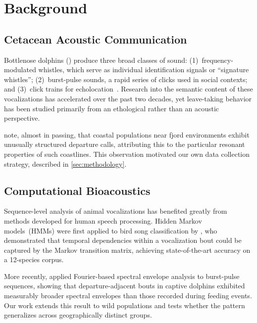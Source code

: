 
\section{Background}
\label{sec:background}

\subsection{Cetacean Acoustic Communication}
\label{subsec:cetacean-acoustics}

Bottlenose dolphins () produce three broad classes of sound:
(1)~frequency-modulated whistles, which serve as individual identification signals or ``signature whistles'';
(2)~burst-pulse sounds, a rapid series of clicks used in social contexts;
and (3)~click trains for echolocation~\citep{Wonko2021communication}.
Research into the semantic content of these vocalizations has accelerated over the past two decades,
yet leave-taking behavior has been studied primarily from an ethological rather than an acoustic perspective.

\citet{Slartibartfast2023topology} note, almost in passing, that coastal populations near fjord environments
exhibit unusually structured departure calls, attributing this to the particular resonant properties of such coastlines.
This observation motivated our own data collection strategy, described in \cref{sec:methodology}.

\subsection{Computational Bioacoustics}
\label{subsec:comp-bioacoustics}

Sequence-level analysis of animal vocalizations has benefited greatly from methods developed for human speech processing.
Hidden Markov models~(HMMs) were first applied to bird song classification by \citet{Deep2022number},
who demonstrated that temporal dependencies within a vocalization bout could be captured by the Markov transition matrix,
achieving state-of-the-art accuracy on a 12-species corpus.

More recently, \citet{Trillian2023signal} applied Fourier-based spectral envelope analysis to burst-pulse sequences,
showing that departure-adjacent bouts in captive dolphins exhibited measurably broader spectral envelopes
than those recorded during feeding events.
Our work extends this result to wild populations and tests whether the pattern generalizes across geographically distinct groups.

